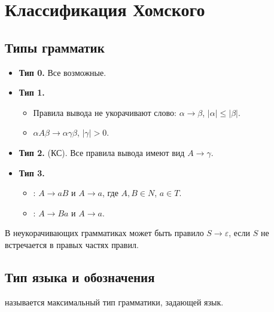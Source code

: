 \documentclass[11pt,a4paper]{article}
\newcommand{\rul}{\rightarrow}
\begin{document}
\section{Классификация Хомского}

\subsection{Типы грамматик}

\begin{itemize}
\item \textbf{Тип 0.} Все возможные.
\item \textbf{Тип 1.}
  \begin{itemize}
  \item {} Правила вывода не укорачивают слово: $\alpha\rul\beta$, $|\alpha|\le|\beta|$.
  \item {} $\alpha A\beta\rul\alpha\gamma\beta$, $|\gamma|>0$.
  \end{itemize}
\item \textbf{Тип 2.}  (КС). Все правила вывода имеют вид $A\rul\gamma$.
\item \textbf{Тип 3.}
  \begin{itemize}
  \item {}: $A\rul aB$ и $A\rul a$, где $A,B\in N$, $a\in T$.
  \item {}: $A\rul Ba$ и $A\rul a$.
  \end{itemize}
\end{itemize}

\begin{zam}
В неукорачивающих грамматиках может быть правило $S\rul\varepsilon$, если $S$ не встречается в правых частях правил.
\end{zam}

\subsection{Тип языка и обозначения}

\begin{opr}
 называется максимальный тип грамматики, задающей язык.
\end{opr}
\end{document}
